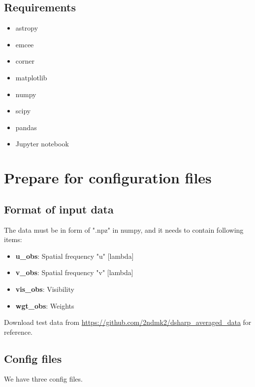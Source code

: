 \documentclass{report}
\begin{document}
\section{Requirements }
\begin{itemize}
    \item astropy
    \item emcee
    \item corner
    \item matplotlib
    \item numpy
    \item scipy
    \item pandas
    \item Jupyter notebook
\end{itemize}


\chapter{Prepare for configuration files \label{sec:prep_sec}}

\section{Format of input data \label{sec:format_data}}
The data must be in form of ".npz" in numpy, and it needs to contain following items: 
\begin{itemize}
    \item \textbf{u\_obs}: Spatial frequency "u" [lambda]
    \item \textbf{v\_obs}: Spatial frequency "v" [lambda]
    \item \textbf{vis\_obs}: Visibility 
    \item \textbf{wgt\_obs}: Weights 
\end{itemize}
Download test data from \url{https://github.com/2ndmk2/dsharp_averaged_data} for reference. 


\section{Config files}
We have three config files. 
\end{document}
